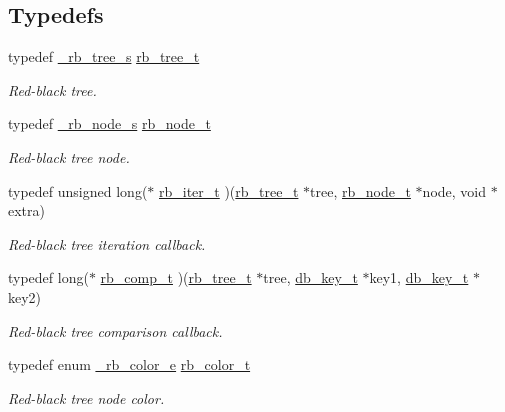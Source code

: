 \subsection*{Typedefs}
\begin{CompactItemize}
\item 
typedef \hyperlink{struct__rb__tree__s}{\_\-rb\_\-tree\_\-s} \hyperlink{group__dbprim__rbtree_ga0}{rb\_\-tree\_\-t}
\begin{CompactList}\small\item\em Red-black tree. \item\end{CompactList}\item 
typedef \hyperlink{struct__rb__node__s}{\_\-rb\_\-node\_\-s} \hyperlink{group__dbprim__rbtree_ga1}{rb\_\-node\_\-t}
\begin{CompactList}\small\item\em Red-black tree node. \item\end{CompactList}\item 
typedef unsigned long($\ast$ \hyperlink{group__dbprim__rbtree_ga2}{rb\_\-iter\_\-t} )(\hyperlink{struct__rb__tree__s}{rb\_\-tree\_\-t} $\ast$tree, \hyperlink{struct__rb__node__s}{rb\_\-node\_\-t} $\ast$node, void $\ast$extra)
\begin{CompactList}\small\item\em Red-black tree iteration callback. \item\end{CompactList}\item 
typedef long($\ast$ \hyperlink{group__dbprim__rbtree_ga3}{rb\_\-comp\_\-t} )(\hyperlink{struct__rb__tree__s}{rb\_\-tree\_\-t} $\ast$tree, \hyperlink{struct__db__key__s}{db\_\-key\_\-t} $\ast$key1, \hyperlink{struct__db__key__s}{db\_\-key\_\-t} $\ast$key2)
\begin{CompactList}\small\item\em Red-black tree comparison callback. \item\end{CompactList}\item 
typedef enum \hyperlink{group__dbprim__rbtree_ga52}{\_\-rb\_\-color\_\-e} \hyperlink{group__dbprim__rbtree_ga4}{rb\_\-color\_\-t}
\begin{CompactList}\small\item\em Red-black tree node color. \item\end{CompactList}\end{CompactItemize}
